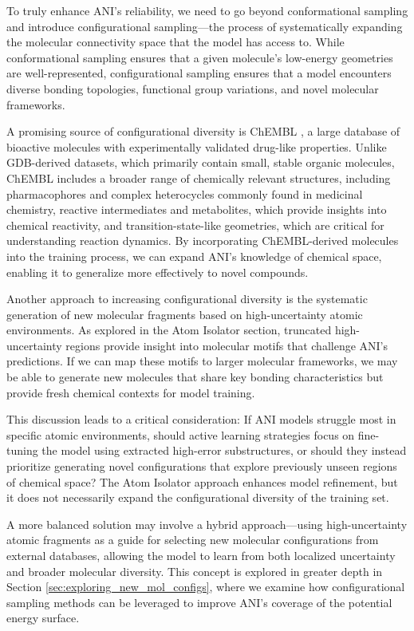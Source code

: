 To truly enhance ANI’s reliability, we need to go beyond conformational sampling and introduce configurational sampling—the process of systematically expanding the molecular connectivity space that the model has access to. While conformational sampling ensures that a given molecule’s low-energy geometries are well-represented, configurational sampling ensures that a model encounters diverse bonding topologies, functional group variations, and novel molecular frameworks.

A promising source of configurational diversity is ChEMBL \cite{ChEMBL_gaulton}, a large database of bioactive molecules with experimentally validated drug-like properties. Unlike GDB-derived datasets, which primarily contain small, stable organic molecules, ChEMBL includes a broader range of chemically relevant structures, including pharmacophores and complex heterocycles commonly found in medicinal chemistry, reactive intermediates and metabolites, which provide insights into chemical reactivity, and transition-state-like geometries, which are critical for understanding reaction dynamics. By incorporating ChEMBL-derived molecules into the training process, we can expand ANI’s knowledge of chemical space, enabling it to generalize more effectively to novel compounds.

Another approach to increasing configurational diversity is the systematic generation of new molecular fragments based on high-uncertainty atomic environments. As explored in the Atom Isolator section, truncated high-uncertainty regions provide insight into molecular motifs that challenge ANI’s predictions. If we can map these motifs to larger molecular frameworks, we may be able to generate new molecules that share key bonding characteristics but provide fresh chemical contexts for model training.

This discussion leads to a critical consideration: If ANI models struggle most in specific atomic environments, should active learning strategies focus on fine-tuning the model using extracted high-error substructures, or should they instead prioritize generating novel configurations that explore previously unseen regions of chemical space? The Atom Isolator approach enhances model refinement, but it does not necessarily expand the configurational diversity of the training set.

A more balanced solution may involve a hybrid approach—using high-uncertainty atomic fragments as a guide for selecting new molecular configurations from external databases, allowing the model to learn from both localized uncertainty and broader molecular diversity. This concept is explored in greater depth in Section \ref{sec:exploring_new_mol_configs}, where we examine how configurational sampling methods can be leveraged to improve ANI’s coverage of the potential energy surface.

